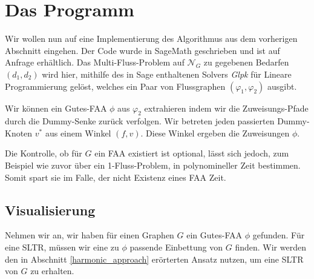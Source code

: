 \chapter{Das Programm}\label{the_program}

Wir wollen nun auf eine Implementierung des Algorithmus aus dem vorherigen Abschnitt eingehen. Der Code wurde in SageMath \cite{sage} geschrieben und ist auf Anfrage erhältlich. Das Multi-Fluss-Problem auf $\mathcal{N}_G$ zu gegebenen Bedarfen $(d_1,d_2)$ wird hier, mithilfe des in Sage enthaltenen Solvers \textit{Glpk} \cite{glpk} für Lineare Programmierung gelöst, welches ein Paar von Flussgraphen $(\varphi_1,\varphi_2)$ ausgibt.



Wir können ein Gutes-FAA $\phi$ aus $\varphi_2$ extrahieren indem wir die Zuweisungs-Pfade durch die Dummy-Senke zurück verfolgen. Wir betreten jeden passierten Dummy-Knoten $v^*$ aus einem Winkel $(f,v)$. Diese Winkel ergeben die Zuweisungen $\phi$.

\begin{remark}
Die Kontrolle, ob für $G$ ein FAA existiert ist optional, lässt sich jedoch, zum Beispiel wie zuvor über ein 1-Fluss-Problem, in polynomineller Zeit bestimmen. Somit spart sie im Falle, der nicht Existenz eines FAA Zeit.
\end{remark}

\section{Visualisierung}

Nehmen wir an, wir haben für einen Graphen $G$ ein Gutes-FAA $\phi$ gefunden. Für eine SLTR, müssen wir eine zu $\phi$ passende Einbettung von $G$ finden. Wir werden den in Abschnitt \ref{harmonic_approach} erörterten Ansatz nutzen, um eine SLTR von $G$ zu erhalten.

